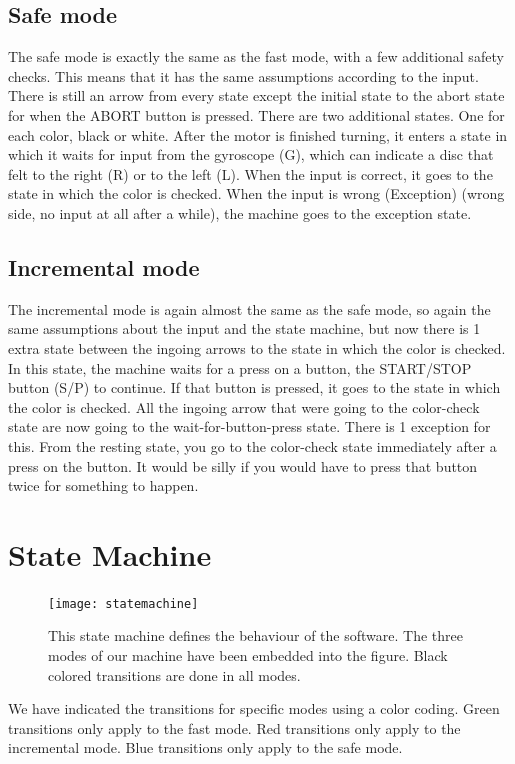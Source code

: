 \documentclass[a4paper,oneside,11pt]{article}
\begin{document}
\newpage

\subsection{Safe mode}
The safe mode is exactly the same as the fast mode, with a few additional safety checks. This means that it has the same assumptions according to the input. There is still an arrow from every state except the initial state to the abort state for when the ABORT button is pressed. There are two additional states. One for each color, black or white. After the motor is finished turning, it enters a state in which it waits for input from the gyroscope (G), which can indicate a disc that felt to the right (R) or to the left (L). When the input is correct, it goes to the state in which the color is checked. When the input is wrong (Exception) (wrong side, no input at all after a while), the machine goes to the exception state.
\subsection{Incremental mode}
The incremental mode is again almost the same as the safe mode, so again the same assumptions about the input and the state machine, but now there is 1 extra state between the ingoing arrows to the state in which the color is checked. In this state, the machine waits for a press on a button, the START/STOP button (S/P) to continue. If that button is pressed, it goes to the state in which the color is checked. All the ingoing arrow that were going to the color-check state are now going to the wait-for-button-press state. There is 1 exception for this. From the resting state, you go to the color-check state immediately after a press on the button. It would be silly if you would have to press that button twice for something to happen.

\section{State Machine}
\begin{figure}[H]
	\centering
	\texttt{[image: statemachine]}
	\caption{This state machine defines the behaviour of the software. The three modes of our machine have been embedded into the figure. Black colored transitions are done in all modes.}
\end{figure}
We have indicated the transitions for specific modes using a color coding. Green transitions only apply to the fast mode. Red transitions only apply to the incremental mode. Blue transitions only apply to the safe mode. 
\end{document}
